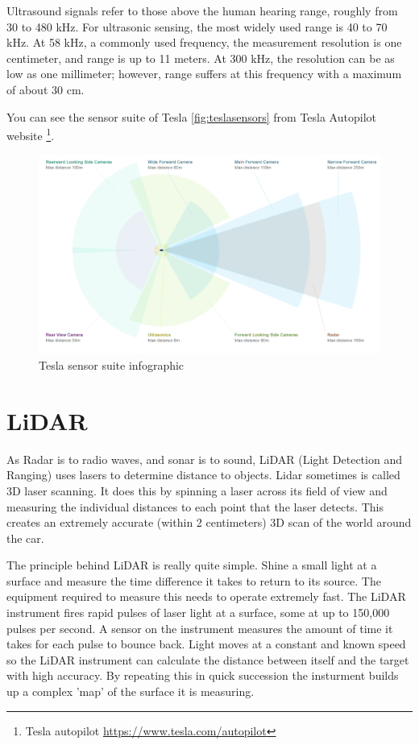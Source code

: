 Ultrasound signals refer to those above the human hearing range, roughly from 30
to 480 kHz. For ultrasonic sensing, the most widely used range is 40 to 70 kHz.
At 58 kHz, a commonly used frequency, the measurement resolution is one
centimeter, and range is up to 11 meters. At 300 kHz, the resolution can be as
low as one millimeter; however, range suffers at this frequency with a maximum
of about 30 cm.

You can see the sensor suite of Tesla \autoref{fig:teslasensors} from
Tesla Autopilot website \footnote{Tesla autopilot
\url{https://www.tesla.com/autopilot}}.

\begin{figure}[!ht]
    \centering
    \includegraphics[width=150mm, keepaspectratio]{figures/teslasensors.png}
    \caption{Tesla sensor suite infographic }
    \label{fig:teslasensors}
\end{figure}


\section{LiDAR}

As Radar is to radio waves, and sonar is to sound, LiDAR (Light Detection and
Ranging) uses lasers to determine distance to objects. Lidar sometimes is called
3D laser scanning. It does this by spinning a laser across its field of view and
measuring the individual distances to each point that the laser detects. This
creates an extremely accurate (within 2 centimeters) 3D scan of the world around
the car.

The principle behind LiDAR is really quite simple. Shine a small light at a
surface and measure the time difference it takes to return to its source. The
equipment required to measure this needs to operate extremely fast. The LiDAR
instrument fires rapid pulses of laser light at a surface, some at up to 150,000
pulses per second. A sensor on the instrument measures the amount of time it
takes for each pulse to bounce back. Light moves at a constant and known speed
so the LiDAR instrument can calculate the distance between itself and the target
with high accuracy. By repeating this in quick succession the insturment builds
up a complex 'map' of the surface it is measuring.

